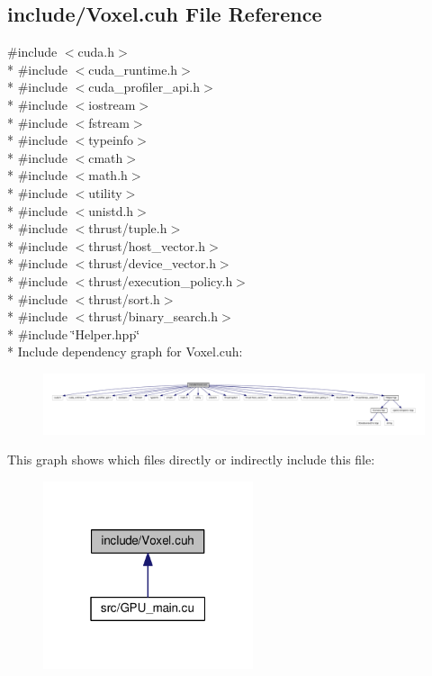 \hypertarget{Voxel_8cuh}{}\subsection{include/\+Voxel.cuh File Reference}
\label{Voxel_8cuh}
{\ttfamily \#include $<$cuda.\+h$>$}\\*
{\ttfamily \#include $<$cuda\+\_\+runtime.\+h$>$}\\*
{\ttfamily \#include $<$cuda\+\_\+profiler\+\_\+api.\+h$>$}\\*
{\ttfamily \#include $<$iostream$>$}\\*
{\ttfamily \#include $<$fstream$>$}\\*
{\ttfamily \#include $<$typeinfo$>$}\\*
{\ttfamily \#include $<$cmath$>$}\\*
{\ttfamily \#include $<$math.\+h$>$}\\*
{\ttfamily \#include $<$utility$>$}\\*
{\ttfamily \#include $<$unistd.\+h$>$}\\*
{\ttfamily \#include $<$thrust/tuple.\+h$>$}\\*
{\ttfamily \#include $<$thrust/host\+\_\+vector.\+h$>$}\\*
{\ttfamily \#include $<$thrust/device\+\_\+vector.\+h$>$}\\*
{\ttfamily \#include $<$thrust/execution\+\_\+policy.\+h$>$}\\*
{\ttfamily \#include $<$thrust/sort.\+h$>$}\\*
{\ttfamily \#include $<$thrust/binary\+\_\+search.\+h$>$}\\*
{\ttfamily \#include \char`\"{}Helper.\+hpp\char`\"{}}\\*
Include dependency graph for Voxel.\+cuh\+:\nopagebreak
\begin{figure}[H]
\begin{center}
\leavevmode
\includegraphics[width=350pt]{Voxel_8cuh__incl}
\end{center}
\end{figure}
This graph shows which files directly or indirectly include this file\+:\nopagebreak
\begin{figure}[H]
\begin{center}
\leavevmode
\includegraphics[width=175pt]{Voxel_8cuh__dep__incl}
\end{center}
\end{figure}
